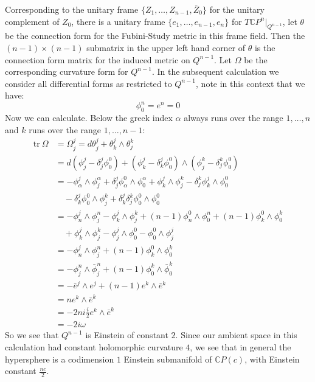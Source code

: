 \documentclass[11pt]{amsart}
\theoremstyle{definition}
\def \CP{ \mathbb{C}P }
\def \C{ \mathbb{C} }
\def \tr{ \text{tr} }
\begin{document}
Corresponding to the unitary frame $\{ Z_1, \ldots, Z_{n-1}, \bar{Z}_0 \}$ for the unitary complement of $Z_0$, there is a unitary frame $ \{ e_1, \ldots, e_{n-1}, e_n \} $ for $T \CP^{n} |_{Q^{n-1}}$, let $\theta$ be the connection form for the Fubini-Study metric in this frame field.  Then the $(n-1) \times (n-1)$ submatrix in the upper left hand corner of $\theta$ is the connection form matrix for the induced metric on $Q^{n-1}$.  Let $\Omega$ be the corresponding curvature form for $Q^{n-1}$.  In the subsequent calculation we consider all differential forms as restricted to $Q^{n-1}$, note in this context that we have:
%
$$ \phi^n_0 = e^n = 0 $$
%
Now we can calculate.  Below the greek index $\alpha$ always runs over the range $1,\ldots,n$ and $k$ runs over the range $1,\ldots,n-1$:
%
\begin{align*}
\tr \ \Omega &= \Omega^j_j = d \theta^j_j + \theta^j_k \wedge \theta^k_j \\
&= d( \phi^j_j - \delta^j_j \phi^0_0 ) + ( \phi^j_k - \delta^j_k \phi^0_0 ) \wedge ( \phi^k_j - \delta^k_j \phi^0_0 ) \\
%
&= - \phi^j_\alpha \wedge \phi^\alpha_j + \delta^j_j \phi^0_\alpha \wedge \phi^\alpha_0 + \phi^j_k \wedge \phi^k_j - \delta^k_j \phi^j_k \wedge \phi^0_0 \\
& \quad  - \delta^j_k \phi^0_0 \wedge \phi^k_j + \delta^j_k \delta^k_j \phi^0_0 \wedge \phi^0_0 \\
%
&= - \phi^j_n \wedge \phi^n_j - \phi^j_k \wedge \phi^k_j + (n-1) \phi^0_n \wedge \phi^n_0 + (n-1) \phi^0_k \wedge \phi^k_0 \\
& \quad + \phi^j_k \wedge \phi^k_j -  \phi^j_j \wedge \phi^0_0 - \phi^0_0 \wedge \phi^j_j \\
%
&= - \phi^j_n \wedge \phi^n_j + (n-1) \phi^0_k \wedge \phi^k_0 \\
&= - \phi^n_j \wedge \bar{\phi}^n_j + (n-1) \phi^k_0 \wedge \bar{\phi}^k_0 \\
&= - \bar{e}^j \wedge e^j + (n-1) e^k \wedge \bar{e}^k \\
&= n e^k \wedge \bar{e}^k \\
&= - 2 n i \frac{i}{2} e^k \wedge \bar{e}^k \\
&= - 2 i \omega
\end{align*}
%
So we see that $Q^{n-1}$ is Einstein of constant $2$.  Since our ambient space in this calculation had constant holomorphic curvature $4$, we see that in general the hypersphere is a codimension $1$ Einstein submanifold of $\C P(c)$, with Einstein constant $\frac{nc}{2}$.
\end{document}
